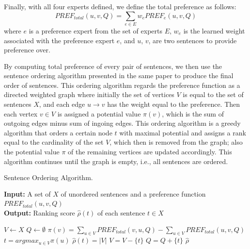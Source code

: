 \documentclass[11pt]{article}
\begin{document}
\indent
Finally, with all four experts defined, we define the total preference as follows:
\begin{equation}
PREF_{total}(u,v,Q)=\sum_{e\in E}{w_ePREF_e(u,v,Q)}
\end{equation}
where $e$ is a preference expert from the set of experts $E$, $w_e$ is the learned weight associated with the preference expert $e$, and $u$, $v$, are two sentences to provide preference over.

\indent
By computing total preference of every pair of sentences, we then use the sentence ordering algorithm presented in the same paper to produce the final order of sentences. This ordering algorithm regards the preference function as a directed weighted graph where initially the set of vertices $V$ is equal to the set of sentences $X$, and each edge $u\rightarrow v$ has the weight equal to the preference. Then each vertex $v\in V$ is assigned a potential value $\pi(v)$, which is the sum of outgoing edges minus sum of ingoing edges. This ordering algorithm is a greedy algorithm that orders a certain node $t$ with maximal potential and assigns a rank equal to the cardinality of the set $V$, which then is removed from the graph; also the potential value $\pi$ of the remaining vertices are updated accordingly. This algorithm continues until the graph is empty, i.e., all sentences are ordered. 

\begin{algorithm}
\caption{Sentence Ordering Algorithm.}\label{euclid}
 \hspace*{\algorithmicindent} \textbf{Input:} A set of $X$ of unordered sentences and a preference function $PREF_{total}(u,v,Q)$\\
 \hspace*{\algorithmicindent} \textbf{Output:} Ranking score $\hat{\rho}{(t)}$ of each sentence $t\in X$
\begin{algorithmic}[1]
\State $V \gets X$
\State $Q \gets \emptyset$
\State $\pi(v)=\sum_{u\in V}PREF_{total}(v,u,Q)-\sum_{u\in V}PREF_{total}(u,v,Q)$
\EndFor
{}
\State $t=argmax_{u\in V}\pi(u)$
\State $\hat{\rho}(t)=|V|$
\State $V=V-\{t\}$
\State $Q=Q+\{t\}$
\EndFor
\EndWhile
\Return $\hat{\rho}$
\EndProcedure
\end{algorithmic}
\end{algorithm}
\end{document}
